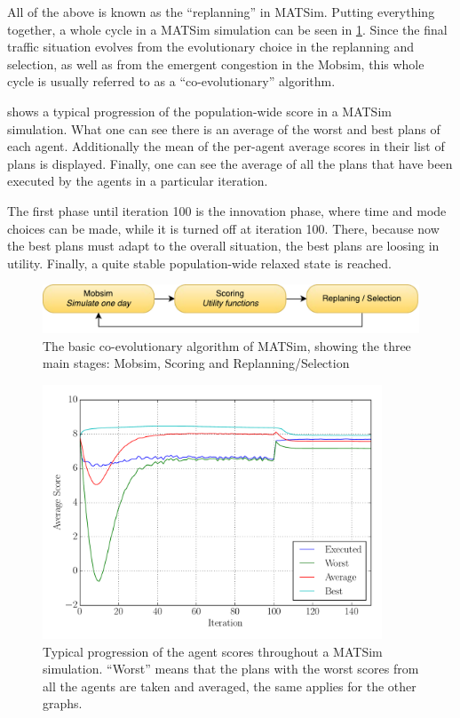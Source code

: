 All of the above is known as the ``replanning'' in MATSim. Putting everything
together, a whole cycle in a MATSim simulation can be seen in \cref{fig:matsimcycle}. Since the
final traffic situation evolves from the evolutionary choice in the replanning and
selection, as well as from the emergent congestion in the Mobsim, this whole
cycle is usually referred to as a ``co-evolutionary'' algorithm.

 shows a typical progression of the population-wide score in
a MATSim simulation. What one can see there is an average of the worst and best plans
of each agent. Additionally the mean of the per-agent average scores in their list of plans is displayed.
Finally, one can see the average of all the plans that have been executed
by the agents in a particular iteration.

The first phase until iteration 100 is the innovation phase, where time and mode
choices can be made, while it is turned off at iteration 100. There, because now
the best plans must adapt to the overall situation, the best plans are loosing in utility.
Finally, a quite stable population-wide relaxed state is reached.

\begin{figure}
    \centering
    \includegraphics[width=1.0\textwidth]{figures/matsimcycle.pdf}
    \caption{The basic co-evolutionary algorithm of MATSim, showing the three main
    stages: Mobsim, Scoring and Replanning/Selection}
    \label{fig:matsimcycle}
\end{figure}

\begin{figure}
    \centering
    \includegraphics[width=0.9\textwidth]{figures/scorestats.pdf}
    \caption{Typical progression of the agent scores throughout a MATSim simulation.
    ``Worst'' means that the plans with the worst scores from all the agents are taken
    and averaged, the same applies for the other graphs.}
    \label{fig:scorestats}
\end{figure}

